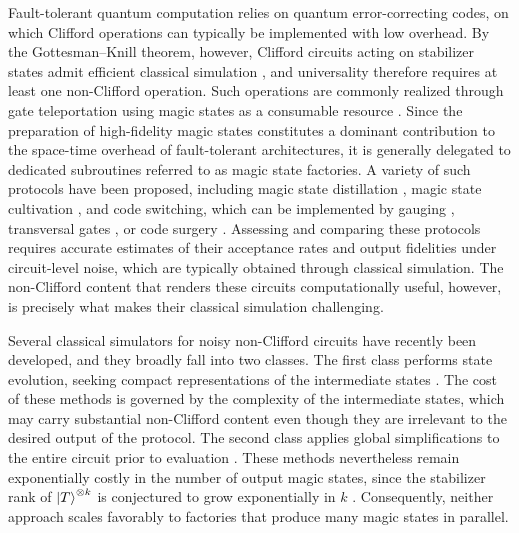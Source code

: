 \documentclass[aps,prx,twocolumn,superscriptaddress,longbibliography]{revtex4-2}
\begin{document}
Fault-tolerant quantum computation relies on quantum error-correcting codes, 
on which Clifford operations can typically be implemented with low overhead. 
By the Gottesman--Knill theorem, however, Clifford circuits acting on stabilizer states 
admit efficient classical simulation \cite{gottesmanHeisenbergRepresentationQuantum1998}, 
and universality therefore requires at least one non-Clifford operation. 
Such operations are commonly realized through gate teleportation 
using magic states as a consumable resource \cite{gottesmanDemonstratingViabilityUniversal1999,bravyiUniversalQuantumComputation2005}. 
Since the preparation of high-fidelity magic states constitutes a dominant contribution 
to the space-time overhead of fault-tolerant architectures, 
it is generally delegated to dedicated subroutines referred to as magic state factories. 
A variety of such protocols have been proposed, 
including magic state distillation \cite{bravyiUniversalQuantumComputation2005}, 
magic state cultivation \cite{gidneyMagicStateCultivation2024}, 
and code switching, which can be implemented by gauging \cite{andersonFaultTolerantConversionSteane2014,Bombín_2016}, 
transversal gates \cite{daguerreCodeSwitchingRevisited2025,wangEfficientFaulttolerantImplementations2024}, 
or code surgery \cite{wangNonCliffordQuantumGate2026}. 
Assessing and comparing these protocols requires accurate estimates of their acceptance rates 
and output fidelities under circuit-level noise, which are typically obtained through classical simulation. 
The non-Clifford content that renders these circuits computationally useful, 
however, is precisely what makes their classical simulation challenging.

Several classical simulators for noisy non-Clifford circuits have recently been developed, 
and they broadly fall into two classes. 
The first class performs state evolution, 
seeking compact representations of the intermediate states 
\cite{liSOFTHighperformanceSimulator2025,chaseClifftFastExact2026,fangSymFTUniversalFaultTolerant2026,hartwegComparingMagicState2026}. 
The cost of these methods is governed by the complexity of the intermediate states, 
which may carry substantial non-Clifford content 
even though they are irrelevant to the desired output of the protocol. 
The second class applies global simplifications to the entire circuit prior to evaluation 
\cite{kissingerSimulatingQuantumCircuits2021,pashayanFastEstimationOutcome2022,haenelTsimFastUniversal2026,surtiEfficientSimulationLogical2025}. 
These methods nevertheless remain exponentially costly in the number of output magic states, 
since the stabilizer rank of $\ket{T}^{\otimes k}$ is conjectured to grow exponentially in $k$ 
\cite{bravyiTradingClassicalQuantum2016}. 
Consequently, neither approach scales favorably to factories that produce many magic states in parallel.
\end{document}
